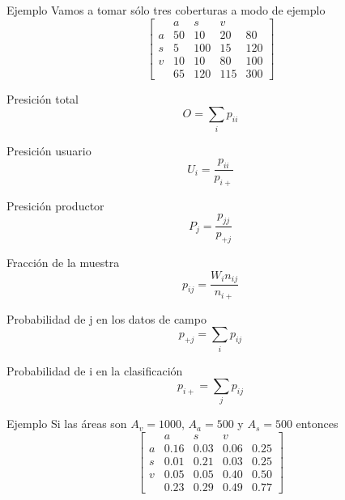 \documentclass[]{beamer}
\begin{document}
\begin{frame}{\subsecname}
  \begin{exampleblock}{Ejemplo}
    Vamos a tomar sólo tres coberturas a modo de ejemplo
    \[
    \begin{bmatrix}
          & a   & s    & v  & \\
        a & 50  & 10   & 20 & 80 \\
        s & 5   & 100  & 15 & 120 \\
        v & 10  & 10   & 80 & 100 \\
          & 65  & 120  & 115& 300
    \end{bmatrix} \]
  \end{exampleblock}
\end{frame}

\begin{frame}{\subsecname}
  \begin{block}{Presición total}
    $$O = \sum_i p_{ii}$$
  \end{block}\pause
  \begin{block}{Presición usuario}
    $$U_i = \frac{p_{ii}}{p_{i+}}$$
  \end{block}\pause
  \begin{block}{Presición productor}
    $$P_j = \frac{p_{jj}}{p_{+j}}$$
  \end{block}  \pause
\end{frame}

\begin{frame}{\subsecname}
  \begin{block}{Fracción de la muestra}
      $$p_{ij} = \frac{W_i n_{ij}}{n_{i+}}$$
  \end{block}\pause
  \begin{block}{Probabilidad de j en los datos de campo}
    $$p_{+j} = \sum_i p_{ij}$$
  \end{block}
  \begin{block}{Probabilidad de i en la clasificación}
    $$p_{i+} = \sum_j p_{ij}$$
  \end{block}
\end{frame}

\begin{frame}{\subsecname}
  \begin{exampleblock}{Ejemplo}
      Si las áreas son $A_v = 1000$, $A_a = 500$ y $A_s = 500$ entonces \pause
    \[
    \begin{bmatrix}
          & a   & s        & v    & \\
        a & 0.16  & 0.03   & 0.06 & 0.25 \\
        s & 0.01  & 0.21   & 0.03 & 0.25 \\
        v & 0.05  & 0.05   & 0.40 & 0.50 \\
          & 0.23  & 0.29   & 0.49 & 0.77
    \end{bmatrix} \]
  \end{exampleblock}
\end{frame}
\end{document}
